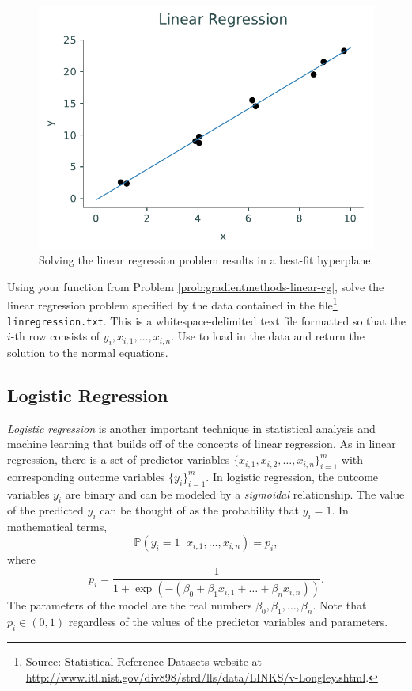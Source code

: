 \begin{figure}[H]
\centering
\includegraphics[width=.7\textwidth]{figures/linregression.pdf}
\caption{Solving the linear regression problem results in a best-fit hyperplane.}
\label{fig:linregression}
\end{figure}

\begin{problem}
Using your function from Problem \ref{prob:gradientmethods-linear-cg}, solve the linear regression problem specified by the data contained in the file\footnote{Source: Statistical Reference Datasets website at \url{http://www.itl.nist.gov/div898/strd/lls/data/LINKS/v-Longley.shtml}.}
\texttt{linregression.txt}.
This is a whitespace-delimited text file formatted so that the $i$-th row consists of $y_i, x_{i,1}, \ldots, x_{i,n}$.
Use  to load in the data and return the solution to the normal equations.
\end{problem}

\subsection*{Logistic Regression} %

\emph{Logistic regression} is another important technique in statistical analysis and machine learning that builds off of the concepts of linear regression.
As in linear regression, there is a set of predictor variables $\{x_{i, 1}, x_{i, 2}, \dots, x_{i, n}\}_{i = 1}^{m}$ with corresponding outcome variables $\{y_i\}_{i = 1}^{m}$.
In logistic regression, the outcome variables $y_i$ are binary and can be modeled by a \emph{sigmoidal} relationship.
The value of the predicted $y_i$ can be thought of as the probability that $y_i = 1$.
In mathematical terms,
\[
\mathbb{P}(y_i = 1 \, | \, x_{i,1}, \dots, x_{i,n}) = p_i,
\]
where
\[
p_i = \frac{1}{1+\exp(-(\beta_0 + \beta_1x_{i,1} + \dots + \beta_nx_{i,n}))}.
\]
The parameters of the model are the real numbers $\beta_0, \beta_1,\dots, \beta_n$.
Note that $p_i \in (0, 1)$ regardless of the values of the predictor variables and parameters.

